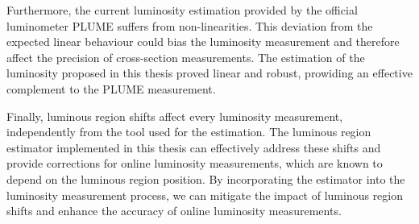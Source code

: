 Furthermore, the current luminosity estimation provided by the official luminometer PLUME suffers from non-linearities. This deviation from the expected linear behaviour could bias the luminosity measurement and therefore affect the precision of cross-section measurements. The estimation of the luminosity proposed in this thesis proved linear and robust, prowiding an effective complement to the PLUME measurement.

Finally, luminous region shifts affect every luminosity measurement, independently from the tool used for the estimation. The luminous region estimator implemented in this thesis can effectively address these shifts and provide corrections for online luminosity measurements, which are known to depend on the luminous region position. By incorporating the estimator into the luminosity measurement process, we can mitigate the impact of luminous region shifts and enhance the accuracy of online luminosity measurements.
